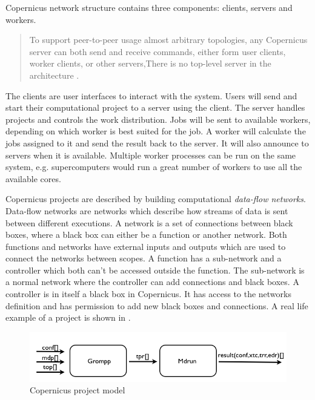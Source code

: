 Copernicus network structure contains three components: clients,
servers and workers.

\begin{quote}
To support peer-to-peer usage almost arbitrary topologies, any
Copernicus server can both send and receive commands, either form
user clients, worker clients, or other servers,There is no top-level
server in the architecture \citep{pronk:2011}.
\end{quote}


The clients are user interfaces to interact with the system. Users
will send and start their computational project to a server using the
client. The server handles projects and controls the work
distribution. Jobs will be sent to available workers, depending on
which worker is best suited for the job. A worker will calculate the
jobs assigned to it and send the result back to the server. It will
also announce to servers when it is available. Multiple worker
processes can be run on the same system, e.g. supercomputers would run
a great number of workers to use all the available cores.

Copernicus projects are described by building computational
\emph{data-flow networks}. Data-flow networks are networks which
describe how streams of data is sent between different executions.  A
network is a set of connections between black boxes, where a black box
can either be a function or another network. Both functions and
networks have external inputs and outputs which are used to connect
the networks between scopes. A function has a sub-network and a
controller which both can't be accessed outside the function. The
sub-network is a normal network where the controller can add
connections and black boxes. A controller is in itself a black box in
Copernicus. It has access to the networks definition and has
permission to add new black boxes and connections. A real life example
of a project is shown in .

\begin{figure}[H]
  \centering
  \includegraphics[scale=0.4]{Chapters/IntroductionIncludes/example.png}
  \caption{Copernicus project model}
  \label{fig:cpcprojectmodel}
\end{figure}

